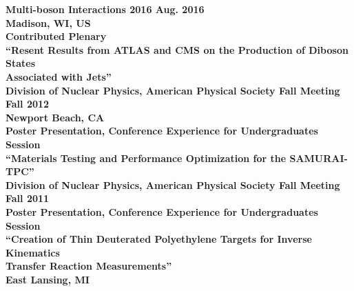 \documentclass[10pt]{res} %
\begin{document}
\begin{resume}
\begin{tabbing}
\bf{Multi-boson Interactions 2016} 		 \> \>	    Aug. 2016 \\
Madison, WI, US \\
Contributed Plenary \\ 
``Resent Results from ATLAS and CMS on the Production of Diboson States \\Associated with Jets'' \\
\bf{Division of Nuclear Physics, American Physical Society Fall Meeting} 		 \> \>	    Fall 2012 \\
Newport Beach, CA \\
Poster Presentation, Conference Experience for Undergraduates Session\\ 
``Materials Testing and Performance Optimization for the SAMURAI-TPC'' \\
\bf{Division of Nuclear Physics, American Physical Society Fall Meeting} 		 \> \>	    Fall 2011 \\
Poster Presentation, Conference Experience for Undergraduates Session\\ 
``Creation of Thin Deuterated Polyethylene Targets for Inverse Kinematics \\Transfer Reaction Measurements'' \\
East Lansing, MI \\
\end{tabbing}


\end{resume}
\end{document}
